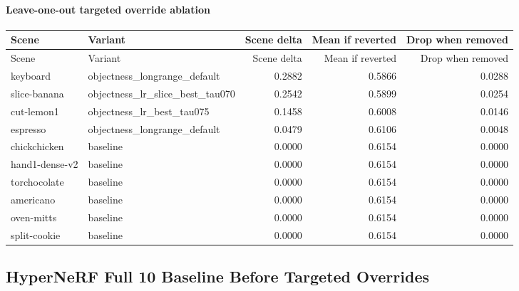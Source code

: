 \documentclass[10pt]{article}
\begin{document}
\paragraph{Leave-one-out targeted override ablation}
\small
\begin{longtable}{llrrr}
\toprule
Scene & Variant & Scene delta & Mean if reverted & Drop when removed \\
\midrule
\endfirsthead
\toprule
Scene & Variant & Scene delta & Mean if reverted & Drop when removed \\
\midrule
\endhead
keyboard & objectness\_longrange\_default & 0.2882 & 0.5866 & 0.0288 \\
slice-banana & objectness\_lr\_slice\_best\_tau070 & 0.2542 & 0.5899 & 0.0254 \\
cut-lemon1 & objectness\_lr\_best\_tau075 & 0.1458 & 0.6008 & 0.0146 \\
espresso & objectness\_longrange\_default & 0.0479 & 0.6106 & 0.0048 \\
chickchicken & baseline & 0.0000 & 0.6154 & 0.0000 \\
hand1-dense-v2 & baseline & 0.0000 & 0.6154 & 0.0000 \\
torchocolate & baseline & 0.0000 & 0.6154 & 0.0000 \\
americano & baseline & 0.0000 & 0.6154 & 0.0000 \\
oven-mitts & baseline & 0.0000 & 0.6154 & 0.0000 \\
split-cookie & baseline & 0.0000 & 0.6154 & 0.0000 \\
\bottomrule
\end{longtable}
\normalsize

\subsection{HyperNeRF Full 10 Baseline Before Targeted Overrides}
\end{document}
